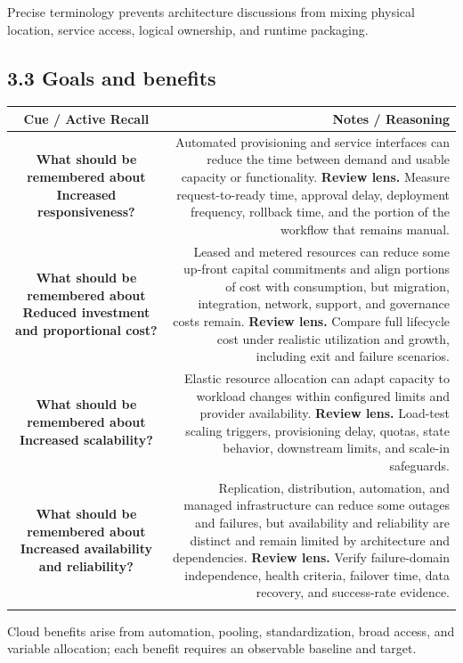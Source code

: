 \documentclass[11pt]{article}
\newcommand{\CornellHeader}{\rowcolor{Navy}\color{white}\bfseries Cue / Active Recall & \color{white}\bfseries Notes / Reasoning \\\endhead}
\newcommand{\CornellRow}[2]{\cellcolor{CueGray}\textbf{#1} & #2 \\\addlinespace[3pt]}
\begin{document}
\begin{sectionsummarybox}
Precise terminology prevents architecture discussions from mixing physical location, service access, logical ownership, and runtime packaging.
\end{sectionsummarybox}
\subsection{3.3 Goals and benefits}
\begin{longtable}{@{}C N@{}}
\CornellHeader
\CornellRow{What should be remembered about Increased responsiveness?}{Automated provisioning and service interfaces can reduce the time between demand and usable capacity or functionality. \textbf{Review lens.} Measure request-to-ready time, approval delay, deployment frequency, rollback time, and the portion of the workflow that remains manual.}
\CornellRow{What should be remembered about Reduced investment and proportional cost?}{Leased and metered resources can reduce some up-front capital commitments and align portions of cost with consumption, but migration, integration, network, support, and governance costs remain. \textbf{Review lens.} Compare full lifecycle cost under realistic utilization and growth, including exit and failure scenarios.}
\CornellRow{What should be remembered about Increased scalability?}{Elastic resource allocation can adapt capacity to workload changes within configured limits and provider availability. \textbf{Review lens.} Load-test scaling triggers, provisioning delay, quotas, state behavior, downstream limits, and scale-in safeguards.}
\CornellRow{What should be remembered about Increased availability and reliability?}{Replication, distribution, automation, and managed infrastructure can reduce some outages and failures, but availability and reliability are distinct and remain limited by architecture and dependencies. \textbf{Review lens.} Verify failure-domain independence, health criteria, failover time, data recovery, and success-rate evidence.}
\end{longtable}
\begin{sectionsummarybox}
Cloud benefits arise from automation, pooling, standardization, broad access, and variable allocation; each benefit requires an observable baseline and target.
\end{sectionsummarybox}
\end{document}
